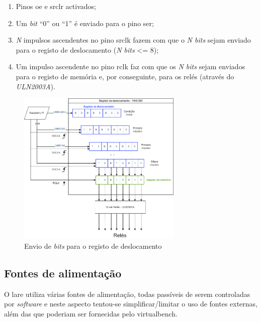 \begin{enumerate}
	\item Pinos \acrshort{oe} e \acrshort{srclr} activados;
	\item Um \textit{bit} ``0'' ou ``1'' é enviado para o pino \acrshort{ser};
	\item \textit{N} impulsos ascendentes no pino \acrshort{srclk} fazem com que o \textit{N bits} sejam enviado para o registo de deslocamento (\textit{N bits} <= 8);
	\item Um impulso ascendente no pino \acrshort{rclk} faz com que os \textit{N bits} sejam enviados para o registo de memória e, por conseguinte, para os relés (através do \textit{ULN2003A}).
\end{enumerate}


\begin{figure}[hbtp]
	\centering
	\includegraphics[width=0.7\textwidth]{figures/registo deslocamente.drawio.png}
	\caption{Envio de \textit{bits} para o registo de deslocamento}
	\label{fig:esquematico74hc595}
\end{figure}

\subsection{Fontes de alimentação}
\label{sec:fontesalimentacao}
O \acrshort{lare} utiliza várias fontes de alimentação, todas passíveis de serem controladas por \textit{software} e neste aspecto tentou-se simplificar/limitar o uso de fontes externas, além das que poderiam ser fornecidas pelo \acrshort{virtualbench}. 

